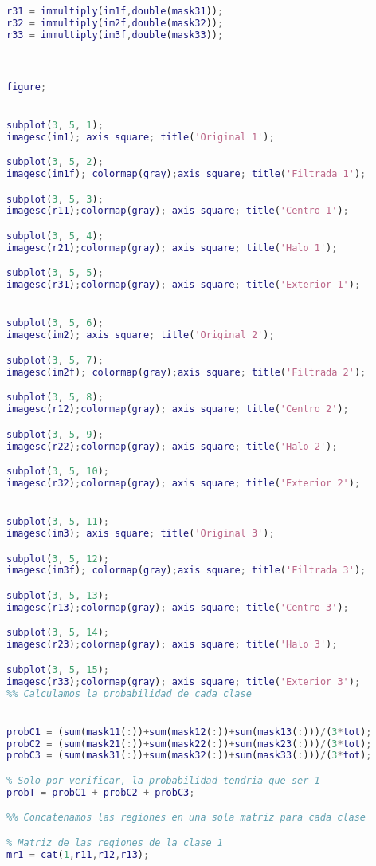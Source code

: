 \documentclass[10pt,journal,compsoc]{IEEEtran}\usepackage[T1]{fontenc}                              %
\begin{document}
\begin{lstlisting}[language=Matlab,basicstyle=\small]
% Obtenemos las regiones de la clase 3
r31 = immultiply(im1f,double(mask31));
r32 = immultiply(im2f,double(mask32));
r33 = immultiply(im3f,double(mask33));



figure;


subplot(3, 5, 1);
imagesc(im1); axis square; title('Original 1');

subplot(3, 5, 2);
imagesc(im1f); colormap(gray);axis square; title('Filtrada 1');

subplot(3, 5, 3);
imagesc(r11);colormap(gray); axis square; title('Centro 1');

subplot(3, 5, 4);
imagesc(r21);colormap(gray); axis square; title('Halo 1');

subplot(3, 5, 5);
imagesc(r31);colormap(gray); axis square; title('Exterior 1');


subplot(3, 5, 6);
imagesc(im2); axis square; title('Original 2');

subplot(3, 5, 7);
imagesc(im2f); colormap(gray);axis square; title('Filtrada 2');

subplot(3, 5, 8);
imagesc(r12);colormap(gray); axis square; title('Centro 2');

subplot(3, 5, 9);
imagesc(r22);colormap(gray); axis square; title('Halo 2');

subplot(3, 5, 10);
imagesc(r32);colormap(gray); axis square; title('Exterior 2');


subplot(3, 5, 11);
imagesc(im3); axis square; title('Original 3');

subplot(3, 5, 12);
imagesc(im3f); colormap(gray);axis square; title('Filtrada 3');

subplot(3, 5, 13);
imagesc(r13);colormap(gray); axis square; title('Centro 3');

subplot(3, 5, 14);
imagesc(r23);colormap(gray); axis square; title('Halo 3');

subplot(3, 5, 15);
imagesc(r33);colormap(gray); axis square; title('Exterior 3');
%% Calculamos la probabilidad de cada clase


probC1 = (sum(mask11(:))+sum(mask12(:))+sum(mask13(:)))/(3*tot);
probC2 = (sum(mask21(:))+sum(mask22(:))+sum(mask23(:)))/(3*tot);
probC3 = (sum(mask31(:))+sum(mask32(:))+sum(mask33(:)))/(3*tot);

% Solo por verificar, la probabilidad tendria que ser 1
probT = probC1 + probC2 + probC3;

%% Concatenamos las regiones en una sola matriz para cada clase

% Matriz de las regiones de la clase 1
mr1 = cat(1,r11,r12,r13);


\end{lstlisting}
\end{document}
